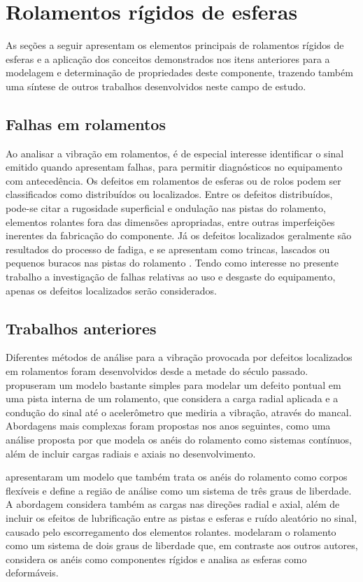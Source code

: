 \documentclass[12pt,oneside,english,brazil,lmodern,siglas,simbolos,cite=num]{ucsmonograph}
\begin{document}
	\section{Rolamentos rígidos de esferas}
	As seções a seguir apresentam os elementos principais de rolamentos rígidos de esferas e a aplicação dos conceitos demonstrados nos itens anteriores para a modelagem e determinação de propriedades deste componente,	trazendo também uma síntese de outros trabalhos desenvolvidos neste campo de estudo.
	
	\subsection{Falhas em rolamentos}
	Ao analisar a vibração em rolamentos, é de especial interesse identificar o sinal emitido quando apresentam falhas, para permitir diagnósticos no equipamento com antecedência.
	Os defeitos em rolamentos de esferas ou de rolos podem ser classificados como distribuídos ou localizados.
	Entre os defeitos distribuídos, pode-se citar a rugosidade superficial e ondulação nas pistas do rolamento, elementos rolantes fora das dimensões apropriadas, entre outras imperfeições inerentes da fabricação do componente.
	Já os defeitos localizados geralmente são resultados do processo de fadiga, e se apresentam como trincas, lascados ou pequenos buracos nas pistas do rolamento \cite{tandon:1997,sassi:2007}.
	Tendo como interesse no presente trabalho a investigação de falhas relativas ao uso e desgaste do equipamento, apenas os defeitos localizados serão considerados.
	
	\subsection{Trabalhos anteriores}
	Diferentes métodos de análise para a vibração provocada por defeitos localizados em rolamentos foram desenvolvidos desde a metade do século passado.
	\citeauthor{mcfadden:1984} propuseram um modelo bastante simples para modelar um defeito pontual em uma pista interna de um rolamento, que considera a carga radial aplicada e a condução do sinal até o acelerômetro que mediria a vibração, através do mancal.
	Abordagens mais complexas foram propostas nos anos seguintes, como uma análise proposta por \citeauthor{tandon:1997} que modela os anéis do rolamento como sistemas contínuos, além de incluir cargas radiais e axiais no desenvolvimento.
	
	\citeauthor{sassi:2007} apresentaram um modelo que também trata os anéis do rolamento como corpos flexíveis e define a região de análise como um sistema de três graus de liberdade.
	A abordagem considera também as cargas nas direções radial e axial, além de incluir os efeitos de lubrificação entre as pistas e esferas e ruído aleatório no sinal, causado pelo escorregamento dos elementos rolantes.	\citeauthor{patil:2010} modelaram o rolamento como um sistema de dois graus de liberdade que, em contraste aos outros autores, considera os anéis como componentes rígidos e analisa as esferas como deformáveis.
		
\end{document}
